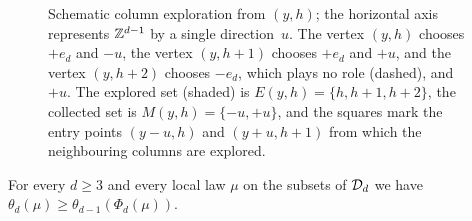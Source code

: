 \documentclass[11pt,letterpaper]{article}
\begin{document}
\begin{figure}[t]
\centering
\begin{tikzpicture}[scale=0.85]

\end{tikzpicture}
\caption{Schematic column exploration from $(y,h)$; the horizontal axis represents $\mathbb Z^{d-1}$ by a single direction~$u$. The vertex $(y,h)$ chooses $+e_d$ and $-u$, the vertex $(y,h+1)$ chooses $+e_d$ and $+u$, and the vertex $(y,h+2)$ chooses $-e_d$, which plays no role (dashed), and $+u$. The explored set (shaded) is $E(y,h)=\{h,h+1,h+2\}$, the collected set is $M(y,h)=\{-u,+u\}$, and the squares mark the entry points $(y-u,h)$ and $(y+u,h+1)$ from which the neighbouring columns are explored.}
\label{fig:column}
\end{figure}

\begin{proposition}\label{prop:projection}
For every $d\ge3$ and every local law $\mu$ on the subsets of $\mathcal D_d$ we have $\theta_d(\mu)\ge\theta_{d-1}(\Phi_d(\mu))$.
\end{proposition}
\end{document}
